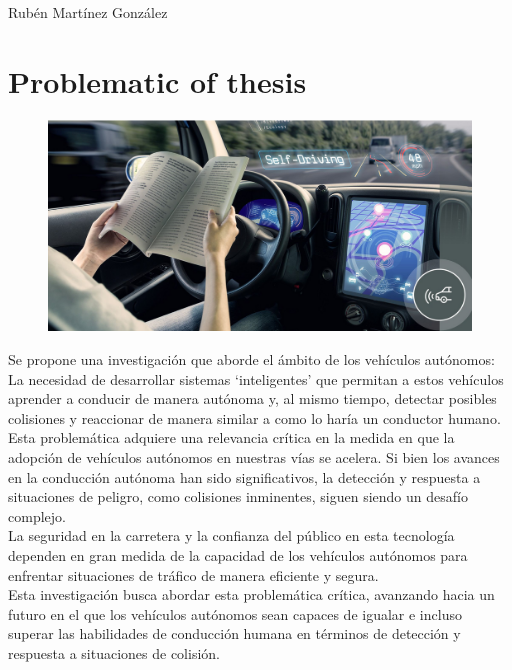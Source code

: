 \documentclass[10pt,letterpaper,final]{article}
\begin{document}
    \section*{}
    Rubén Martínez González
    \section*{Problematic of thesis}
    \begin{figure}[!ht]
        \includegraphics[width=\textwidth]{img/1}\label{fig:self-driving}
    \end{figure}
    \newline
    \noindent Se propone una investigación que aborde el ámbito de los vehículos autónomos:\\
    La necesidad de desarrollar sistemas ‘inteligentes' que permitan a estos vehículos aprender a conducir de manera autónoma y,
    al mismo tiempo, detectar posibles colisiones y reaccionar de manera similar a como lo haría un conductor humano.\\
    Esta problemática adquiere una relevancia crítica en la medida en que la adopción de vehículos autónomos en nuestras
    vías se acelera. Si bien los avances en la conducción autónoma han sido significativos, la detección y respuesta a
    situaciones de peligro, como colisiones inminentes, siguen siendo un desafío complejo.\\
    La seguridad en la carretera y la confianza del público en esta tecnología dependen en gran medida de la capacidad
    de los vehículos autónomos para enfrentar situaciones de tráfico de manera eficiente y segura.\\
    Esta investigación busca abordar esta problemática crítica, avanzando hacia un futuro en el que los vehículos autónomos
    sean capaces de igualar e incluso superar las habilidades de conducción humana en términos de detección y respuesta
    a situaciones de colisión.
    \clearpage
\end{document}
